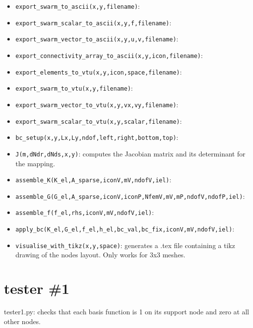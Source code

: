 \begin{itemize}
\begin{itemize}
\item \lstinline{export_swarm_to_ascii(x,y,filename)}:
\item \lstinline{export_swarm_scalar_to_ascii(x,y,f,filename)}:
\item \lstinline{export_swarm_vector_to_ascii(x,y,u,v,filename)}:
\item \lstinline{export_connectivity_array_to_ascii(x,y,icon,filename)}:
\item \lstinline{export_elements_to_vtu(x,y,icon,space,filename)}:
\item \lstinline{export_swarm_to_vtu(x,y,filename)}:
\item \lstinline{export_swarm_vector_to_vtu(x,y,vx,vy,filename)}:
\item \lstinline{export_swarm_scalar_to_vtu(x,y,scalar,filename)}:
\item \lstinline{bc_setup(x,y,Lx,Ly,ndof,left,right,bottom,top)}:
\item \lstinline{J(m,dNdr,dNds,x,y)}: computes the Jacobian matrix and its determinant 
for the mapping. 
\item \lstinline{assemble_K(K_el,A_sparse,iconV,mV,ndofV,iel)}:
\item \lstinline{assemble_G(G_el,A_sparse,iconV,iconP,NfemV,mV,mP,ndofV,ndofP,iel)}:
\item \lstinline{assemble_f(f_el,rhs,iconV,mV,ndofV,iel)}:
\item \lstinline{apply_bc(K_el,G_el,f_el,h_el,bc_val,bc_fix,iconV,mV,ndofV,iel)}:
\item \lstinline{visualise_with_tikz(x,y,space)}: generates a .tex file containing 
a tikz drawing of the nodes layout. Only works for 3x3 meshes. 
\end{itemize}

\end{itemize}

\newpage
\section*{tester \#1}



{\pythonfile tester1.py}: checks that each basis function is 1 on its support node and zero at all other nodes.



